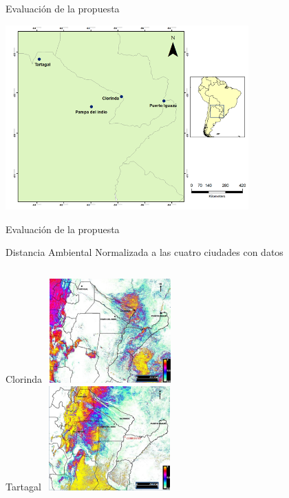 \documentclass[10pt]{beamer}
\begin{document}
\begin{frame}{Evaluación de la propuesta}
  \begin{center}
    \includegraphics[width=0.7\textwidth]{zonas_ned1}
  \end{center}
\end{frame}




\begin{frame}{Evaluación de la propuesta}
  \begin{center}
    Distancia Ambiental Normalizada a las cuatro ciudades con datos
  \end{center}

  \begin{columns}[t]
  \centering
  Clorinda
  \includegraphics[width=5cm,height=4cm]{ned_clorinda}\\
  \centering
  Tartagal
  \includegraphics[width=5cm,height=4cm]{ned_tartagal}
  \end{columns}

\end{frame}
\end{document}
